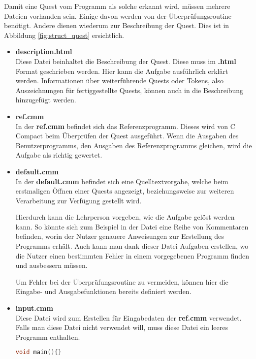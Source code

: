 Damit eine Quest vom Programm als solche erkannt wird, müssen mehrere Dateien vorhanden sein. Einige davon werden von der Überprüfungsroutine benötigt. Andere dienen wiederum zur Beschreibung der Quest. Dies ist in Abbildung \ref{fig:struct_quest} ersichtlich.

\begin{itemize}
\item \textbf{description.html}\\
Diese Datei beinhaltet die Beschreibung der Quest. Diese muss im \textbf{.html} Format geschrieben werden. Hier kann die Aufgabe ausführlich erklärt werden. Informationen über weiterführende Quests oder Tokens, also Auszeichnungen für fertiggestellte Quests, können auch in die Beschreibung hinzugefügt werden.

\item \textbf{ref.cmm}\\
In der \textbf{ref.cmm} befindet sich das Referenzprogramm. Dieses wird von C Compact beim Überprüfen der Quest ausgeführt. Wenn die Ausgaben des Benutzerprogramms, den Ausgaben des Referenzprogramms gleichen, wird die Aufgabe als richtig gewertet.

\item \textbf{default.cmm}\\
In der \textbf{default.cmm} befindet sich eine Quelltextvorgabe, welche beim erstmaligen Öffnen einer Quests angezeigt, beziehungsweise zur weiteren Verarbeitung zur Verfügung gestellt wird. 

Hierdurch kann die Lehrperson vorgeben, wie die Aufgabe gelöst werden kann. So könnte sich zum Beispiel in der Datei eine Reihe von Kommentaren befinden, worin der Nutzer genauere Anweisungen zur Erstellung des Programms erhält. Auch kann man dank dieser Datei Aufgaben erstellen, wo die Nutzer einen bestimmten Fehler in einem vorgegebenen Programm finden und ausbessern müssen. 

Um Fehler bei der Überprüfungsroutine zu vermeiden, können hier die Eingabe- und Ausgabefunktionen bereits definiert werden. 

\item \textbf{input.cmm}\\
Diese Datei wird zum Erstellen für Eingabedaten der \textbf{ref.cmm} verwendet. Falls man diese Datei nicht verwendet will, muss diese Datei ein leeres Programm enthalten. 
\begin{lstlisting}[language=C]
void main(){}
\end{lstlisting}
\end{itemize}


